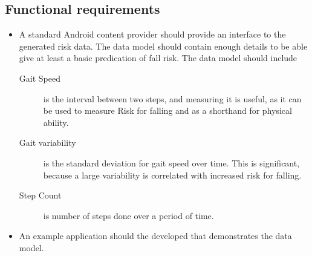 \subsection{Functional requirements}
\begin{itemize}
\item A standard Android content provider should provide an interface to the generated risk data. The data model should contain enough details to be able give at least a basic predication of fall risk. The data model should include 
\begin{description}
\item[Gait Speed] \label{def:gaitSpeed}is the interval between two steps, and measuring it is useful, as it can be used to measure Risk for falling and as a shorthand for physical ability.
\item[Gait variability] \label{def:gaitVariability}is the standard deviation for gait speed over time. This is significant, because a large variability is correlated with increased risk for falling.
\item[Step Count] \label{def:stepCount}is number of steps done over a period of time. 
\end{description}
\item An example application should the developed that demonstrates the data model.
\end{itemize}	

